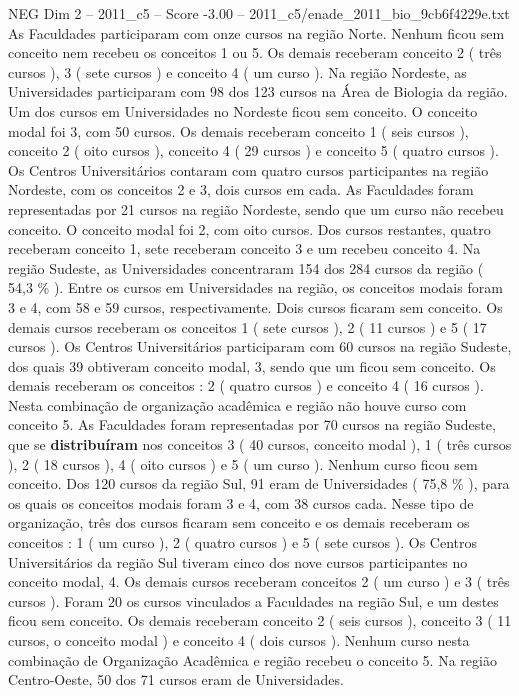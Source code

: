 \begin{textsample}{NEG Dim 2 – 2011\_c5 – Score -3.00 – 2011\_c5/enade\_2011\_bio\_9cb6f4229e.txt}
As Faculdades participaram com onze cursos na região Norte.
Nenhum ficou sem conceito nem recebeu os conceitos 1 ou 5.
Os demais receberam conceito 2 ( três cursos ), 3 ( sete cursos ) e conceito 4 ( um curso ).
Na região Nordeste, as Universidades participaram com 98 dos 123 cursos na Área de Biologia da região.
Um dos cursos em Universidades no Nordeste ficou sem conceito.
O conceito modal foi 3, com 50 cursos.
Os demais receberam conceito 1 ( seis cursos ), conceito 2 ( oito cursos ), conceito 4 ( 29 cursos ) e conceito 5 ( quatro cursos ).
Os Centros Universitários contaram com quatro cursos participantes na região Nordeste, com os conceitos 2 e 3, dois cursos em cada.
As Faculdades foram representadas por 21 cursos na região Nordeste, sendo que um curso não recebeu conceito.
O conceito modal foi 2, com oito cursos.
Dos cursos restantes, quatro receberam conceito 1, sete receberam conceito 3 e um recebeu conceito 4.
Na região Sudeste, as Universidades concentraram 154 dos 284 cursos da região ( 54,3 \% ).
Entre os cursos em Universidades na região, os conceitos modais foram 3 e 4, com 58 e 59 cursos, respectivamente.
Dois cursos ficaram sem conceito.
Os demais cursos receberam os conceitos 1 ( sete cursos ), 2 ( 11 cursos ) e 5 ( 17 cursos ).
Os Centros Universitários participaram com 60 cursos na região Sudeste, dos quais 39 obtiveram conceito modal, 3, sendo que um ficou sem conceito.
Os demais receberam os conceitos : 2 ( quatro cursos ) e conceito 4 ( 16 cursos ).
Nesta combinação de organização acadêmica e região não houve curso com conceito 5.
As Faculdades foram representadas por 70 cursos na região Sudeste, que se \textbf{distribuíram} nos conceitos 3 ( 40 cursos, conceito modal ), 1 ( três cursos ), 2 ( 18 cursos ), 4 ( oito cursos ) e 5 ( um curso ).
Nenhum curso ficou sem conceito.
Dos 120 cursos da região Sul, 91 eram de Universidades ( 75,8 \% ), para os quais os conceitos modais foram 3 e 4, com 38 cursos cada.
Nesse tipo de organização, três dos cursos ficaram sem conceito e os demais receberam os conceitos : 1 ( um curso ), 2 ( quatro cursos ) e 5 ( sete cursos ).
Os Centros Universitários da região Sul tiveram cinco dos nove cursos participantes no conceito modal, 4.
Os demais cursos receberam conceitos 2 ( um curso ) e 3 ( três cursos ).
Foram 20 os cursos vinculados a Faculdades na região Sul, e um destes ficou sem conceito.
Os demais receberam conceito 2 ( seis cursos ), conceito 3 ( 11 cursos, o conceito modal ) e conceito 4 ( dois cursos ).
Nenhum curso nesta combinação de Organização Acadêmica e região recebeu o conceito 5.
Na região Centro-Oeste, 50 dos 71 cursos eram de Universidades.

\end{textsample}
